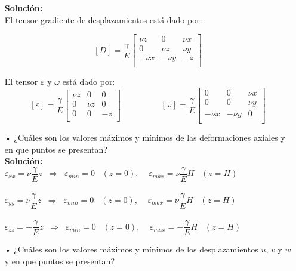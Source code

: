 \documentclass[../notas medios.tex]{subfiles}
\begin{document}
\begin{enumerate}
	\textbf{Solución:}\\
	
	El tensor gradiente de desplazamientos está dado por: 
	
	\[[D]
 	=   \dfrac{\gamma}{E}
 	\begin{bmatrix}
     	 \nu  z & 0 &  \nu  x\\
     	0 &  \nu  z &  \nu  y\\
     	- \nu x & - \nu  y &  - z\\
 	\end{bmatrix} \]
 	
 	El tensor  $\varepsilon$ y $\omega$ está dado por: 
 		\[[\varepsilon]
 	= \dfrac{\gamma}{E}
 	\begin{bmatrix}
     	 \nu  z & 0 &  0\\
     	0 &  \nu  z &  0\\
     	0 & 0 &  -  z\\
 	\end{bmatrix} 
 	\hspace{2cm}
 	[\omega]
 	= \dfrac{\gamma}{E}
 	\begin{bmatrix}
     	 0 & 0 &  \nu x\\
     	0 & 0 &  \nu y\\
     	- \nu x & - \nu  y &  0\\
 	\end{bmatrix} \]
	\item[•]¿Cuáles son los valores máximos y mínimos de las deformaciones 
	axiales y en que puntos se presentan? \\
		
	\textbf{Solución:} \\
	
$\varepsilon_{xx} =  \nu \dfrac{\gamma}{E} z  \;\; \Longrightarrow  \;\; \varepsilon_{min} = 0  \;\;\; (z=0),  \;\;\;\;  \varepsilon_{max} = \nu \dfrac{\gamma}{E} H \;\;\; (z=H) $\\\\
$\varepsilon_{yy} =  \nu \dfrac{\gamma}{E} z  \;\; \Longrightarrow  \;\; \varepsilon_{min} = 0  \;\;\; (z=0),  \;\;\;\;  \varepsilon_{max} = \nu \dfrac{\gamma}{E} H \;\;\; (z=H)$ \\\\
$\varepsilon_{zz} =  - \dfrac{\gamma}{E} z  \;\; \Longrightarrow  \;\; \varepsilon_{min} = 0  \;\;\; (z=0),  \;\;\;\;  \varepsilon_{max} = - \dfrac{\gamma}{E} H \;\;\; (z=H)$ \\
	\item[•] ¿Cuáles son los valores máximos y mínimos de los desplazamientos 
	$u$, $v$ y $w$ y en que puntos se presentan?
		


\end{enumerate}
\end{document}
